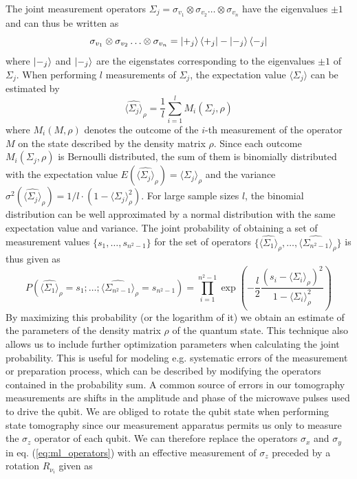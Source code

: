 The joint measurement operators $\Sigma_j = \sigma_{v_1}\otimes \sigma_{v_2}\hdots \otimes\sigma_{v_n}$ have the eigenvalues $\pm 1$ and can thus be written as 
\begin{equation}
\sigma_{v_1}\otimes \sigma_{v_2}\hdots \otimes\sigma_{v_n} = \left| +_j \right>\left< +_j \right|-\left| -_j \right>\left< -_j \right| \label{eq:ml_operators}
\end{equation}
where $\left| -_j \right>$ and $\left| -_j \right>$ are the eigenstates corresponding to the eigenvalues $\pm 1$ of $\Sigma_j$. When performing $l$ measurements of $\Sigma_j$, the expectation value $\langle \Sigma_j \rangle$ can be estimated by
\begin{equation}
\widehat{\langle \Sigma_j \rangle}_\rho = \frac{1}{l}\sum\limits_{i = 1}^l M_i(\Sigma_j,\rho) \label{eq:tomography_measurement_estimator}
\end{equation}
 where $M_i(M,\rho)$ denotes the outcome of the $i$-th measurement of the operator $M$ on the state described by the density matrix $\rho$. Since each outcome $M_i(\Sigma_j,\rho)$ is Bernoulli distributed, the sum of them is binomially distributed with the expectation value $E(\widehat{\langle \Sigma_j \rangle}_\rho) = \langle \Sigma_j \rangle_\rho$ and the variance $\sigma^2(\widehat{\langle \Sigma_j \rangle}_\rho) = 1/l \cdot (1-\langle \Sigma_j \rangle_\rho^2)$. For large sample sizes $l$, the binomial distribution can be well approximated by a normal distribution with the same expectation value and variance. The joint probability of obtaining a set of measurement values $\{s_1,\hdots,s_{n^2-1}\}$ for the set of operators $\{\widehat{\langle\Sigma_1 \rangle}_\rho,\hdots,\widehat{\langle\Sigma_{n^2-1} \rangle}_\rho\}$ is thus given as
\begin{equation}
P\left(\widehat{\langle \Sigma_1 \rangle }_\rho = s_1;\hdots;\widehat{\langle \Sigma_{n^2-1} \rangle}_\rho =  s_{n^2-1}\right) = \prod\limits_{i = 1}^{n^2-1} \exp{\left(-\frac{l}{2}\frac{(s_i-\langle \Sigma_i \rangle_\rho)^2}{1-\langle \Sigma_i \rangle_\rho^2}\right)}
\end{equation}
By maximizing this probability (or the logarithm of it) we obtain an estimate of the parameters of the density matrix $\rho$ of the quantum state. This technique also allows us to include further optimization parameters when calculating the joint probability. This is useful for modeling e.g. systematic errors of the measurement or preparation process, which can be described by modifying the operators contained in the probability sum. A common source of errors in our tomography measurements are shifts in the amplitude and phase of the microwave pulses used to drive the qubit. We are obliged to rotate the qubit state when performing state tomography since our measurement apparatus permits us only to measure the $\sigma_z$ operator of each qubit. We can therefore replace the operators $\sigma_x$ and $\sigma_y$ in eq. (\ref{eq:ml_operators}) with an effective measurement of $\sigma_z$ preceded by a rotation $R_{\nu_i}$ given as
